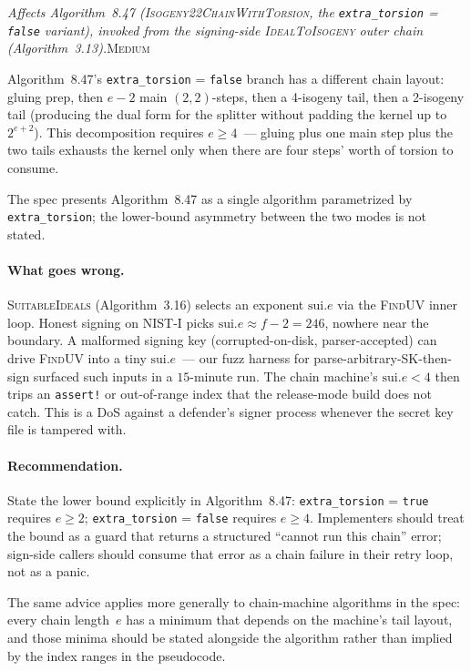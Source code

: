 \documentclass[a4paper,11pt]{article}
\newcommand{\algo}[1]{Algorithm~#1}
\newcommand{\medium}{\textsc{\color{RoyalBlue}Medium}}
\newcommand{\finding}[2]{\noindent\textit{#1}\hfill#2\par\smallskip}
\begin{document}
\finding{Affects \algo{8.47}
(\textsc{Isogeny22ChainWithTorsion}, the
\texttt{extra\_torsion} = \texttt{false} variant), invoked from
the signing-side \textsc{IdealToIsogeny} outer chain
(\algo{3.13}).}{\medium}

\algo{8.47}'s \texttt{extra\_torsion} = \texttt{false} branch has
a different chain layout: gluing prep, then $e - 2$ main
$(2,2)$-steps, then a 4-isogeny tail, then a 2-isogeny tail
(producing the dual form for the splitter without padding the
kernel up to $2^{e+2}$).  This decomposition requires
$e \geq 4$~--- gluing plus one main step plus the two tails
exhausts the kernel only when there are four steps' worth of
torsion to consume.

The spec presents \algo{8.47} as a single algorithm parametrized
by \texttt{extra\_torsion}; the lower-bound asymmetry between
the two modes is not stated.

\paragraph{What goes wrong.}
\textsc{SuitableIdeals} (\algo{3.16}) selects an exponent
$\mathrm{sui}.e$ via the \textsc{FindUV} inner loop.  Honest
signing on NIST-I picks $\mathrm{sui}.e \approx f - 2 = 246$,
nowhere near the boundary.  A malformed signing key
(corrupted-on-disk, parser-accepted) can drive \textsc{FindUV}
into a tiny $\mathrm{sui}.e$~--- our fuzz harness for
parse-arbitrary-SK-then-sign surfaced such inputs in a
$15$-minute run.  The chain machine's
$\mathrm{sui}.e < 4$ then trips an
\texttt{assert!} or out-of-range index that the
release-mode build does not catch.  This is a DoS against a
defender's signer process whenever the secret key file is
tampered with.

\paragraph{Recommendation.}
State the lower bound explicitly in \algo{8.47}:
\texttt{extra\_torsion} = \texttt{true} requires
$e \geq 2$; \texttt{extra\_torsion} = \texttt{false} requires
$e \geq 4$.  Implementers should treat the bound as a guard
that returns a structured ``cannot run this chain'' error;
sign-side callers should consume that error as a chain failure
in their retry loop, not as a panic.

The same advice applies more generally to chain-machine
algorithms in the spec: every chain length~$e$ has a minimum
that depends on the machine's tail layout, and those minima
should be stated alongside the algorithm rather than implied by
the index ranges in the pseudocode.
\end{document}

